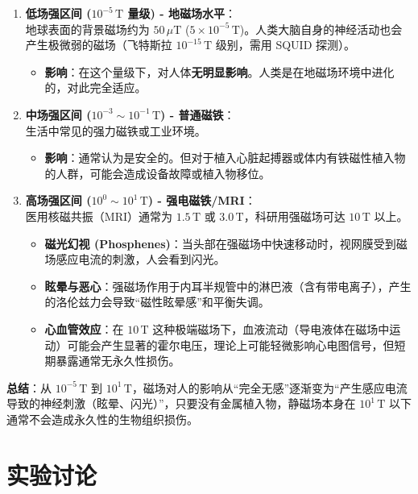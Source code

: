 \documentclass[11pt]{article}
\begin{document}
\begin{enumerate}
    \item \textbf{低场强区间 ($10^{-5}\,\text{T}$ 量级) - 地磁场水平}：\\
    地球表面的背景磁场约为 $50\,\mu\text{T}$ ($5 \times 10^{-5}\,\text{T}$)。人类大脑自身的神经活动也会产生极微弱的磁场（飞特斯拉 $10^{-15}\,\text{T}$ 级别，需用 SQUID 探测）。
    \begin{itemize}
        \item \textbf{影响}：在这个量级下，对人体\textbf{无明显影响}。人类是在地磁场环境中进化的，对此完全适应。
    \end{itemize}

    \item \textbf{中场强区间 ($10^{-3} \sim 10^{-1}\,\text{T}$) - 普通磁铁}：\\
    生活中常见的强力磁铁或工业环境。
    \begin{itemize}
        \item \textbf{影响}：通常认为是安全的。但对于植入心脏起搏器或体内有铁磁性植入物的人群，可能会造成设备故障或植入物移位。
    \end{itemize}

    \item \textbf{高场强区间 ($10^0 \sim 10^1\,\text{T}$) - 强电磁铁/MRI}：\\
    医用核磁共振（MRI）通常为 $1.5\,\text{T}$ 或 $3.0\,\text{T}$，科研用强磁场可达 $10\,\text{T}$ 以上。
    \begin{itemize}
        \item \textbf{磁光幻视 (Phosphenes)}：当头部在强磁场中快速移动时，视网膜受到磁场感应电流的刺激，人会看到闪光。
        \item \textbf{眩晕与恶心}：强磁场作用于内耳半规管中的淋巴液（含有带电离子），产生的洛伦兹力会导致“磁性眩晕感”和平衡失调。
        \item \textbf{心血管效应}：在 $10\,\text{T}$ 这种极端磁场下，血液流动（导电液体在磁场中运动）可能会产生显著的霍尔电压，理论上可能轻微影响心电图信号，但短期暴露通常无永久性损伤。
    \end{itemize}
\end{enumerate}

\textbf{总结}：从 $10^{-5}\,\text{T}$ 到 $10^1\,\text{T}$，磁场对人的影响从“完全无感”逐渐变为“产生感应电流导致的神经刺激（眩晕、闪光）”，只要没有金属植入物，静磁场本身在 $10^1\,\text{T}$ 以下通常不会造成永久性的生物组织损伤。

\section{实验讨论}
\end{document}
